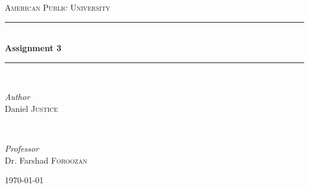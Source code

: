 \documentclass[11pt]{article}
\begin{document}

\begin{titlepage} %
	\newcommand{\HRule}{\rule{\linewidth}{0.5mm}} %

	\center %


	\textsc{\LARGE American Public University}\\[1.5cm] %


	\HRule\\[0.4cm]

	{\huge\bfseries Assignment 3}\\[0.4cm] %

	\HRule\\[1.5cm]


	\begin{minipage}{0.4\textwidth}
		\begin{flushleft}
			\large
			\textit{Author}\\
			Daniel \textsc{Justice} %
		\end{flushleft}
	\end{minipage}
	~
	\begin{minipage}{0.4\textwidth}
		\begin{flushright}
			\large
			\textit{Professor}\\
			Dr. Farshad \textsc{Foroozan} %
		\end{flushright}
	\end{minipage}


	\vfill\vfill\vfill
	{\large\today} %
	\vfill

\end{titlepage}
\end{document}
